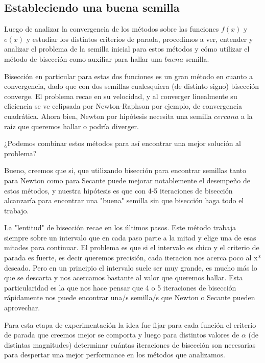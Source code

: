 \subsection{Estableciendo una buena semilla}

Luego de analizar la convergencia de los métodos sobre las funciones $f(x)$ y $e(x)$ y estudiar los distintos criterios de parada, procedimos a ver, entender y analizar el problema de la semilla inicial para estos métodos y cómo utilizar el método de bisección como auxiliar para hallar una $buena$ semilla.

Bisección en particular para estas dos funciones es un gran método en cuanto a convergencia, dado que con dos semillas cualesquiera (de distinto signo) bisección converge. El problema recae en su velocidad, y al converger linealmente su eficiencia se ve eclipsada por Newton-Raphson por ejemplo, de convergencia cuadrática. Ahora bien, Newton por hipótesis necesita una semilla $cercana$ a la raiz que queremos hallar o podría diverger.

¿Podemos combinar estos métodos para así encontrar una mejor solución al problema?

Bueno, creemos que si, que utilizando bisección para encontrar semillas tanto para Newton como para Secante puede mejorar notablemente el desempeño de estos métodos, y nuestra hipótesis es que con 4-5 iteraciones de bisección alcanzaría para encontrar una "buena" semilla sin que bisección haga todo el trabajo.

La "lentitud" de bisección recae en los últimos pasos. Este método trabaja siempre sobre un intervalo que en cada paso parte a la mitad y elige una de esas mitades para continuar. El problema es que si el intervalo es chico y el criterio de parada es fuerte, es decir queremos precisión, cada iteracion nos acerca poco al x* deseado. Pero en un principio el intervalo suele ser muy grande, es mucho más lo que se descarta y nos acercamos bastante al valor que queremos hallar. Esta particularidad es la que nos hace pensar que 4 o 5 iteraciones de bisección rápidamente nos puede encontrar una/s semilla/s que Newton o Secante pueden aprovechar.

Para esta etapa de experimentación la idea fue fijar para cada función el criterio de parada que creemos mejor se comporta y luego para distintos valores de $\alpha$ (de distintas magnitudes) determinar cuántas iteraciones de bisección son necesarias para despertar una mejor performance en los métodos que analizamos.
